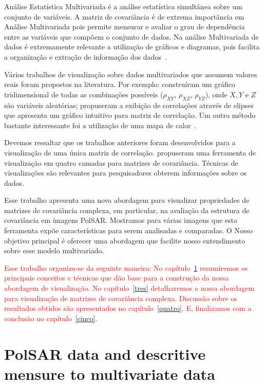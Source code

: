 \documentclass[a4paper,12pt]{article}
\begin{document}
Análise Estatística Multivariada é a análise estatística simultânea sobre um conjunto de variáveis. A matriz de covariância é de extrema importância em Análise Multivariada pois permite mensurar e avaliar o grau de dependência entre as variáveis que compõem o conjunto de dados. Na análise Multivariada de dados é extremamente relevante a utilização de gráficos e diagramas, pois facilita a organização e extração de informação dos dados~\citep{anderson-1958, Everitt-2011}.

Vários trabalhos de visualização sobre dados multivariados que assumem valores reais foram propostos na literatura. Por exemplo: \citet{Rousseeuw-1994} construíram um gráfico tridimensional de todas as combinações possíveis ($\rho_{XY}$, $\rho_{XZ}$, $\rho_{YZ}$), onde $X, Y$ e $Z$ são variáveis aleatórias; \citet{Murdoch-1996} propuseram a exibição de correlações através de elipses que apresenta um gráfico intuitivo para matriz de correlação. Um outro método bastante interessante foi a utilização de uma mapa de calor~\citep{Friendly-2002}.

Devemos ressaltar que os trabalhos anteriores foram desenvolvidos para a visualização de uma única matriz de correlação. \citet{tokuda-2011} propuseram uma ferramenta de visualização em quatro camadas para matrizes de covariância. Técnicas de visualizações são relevantes para pesquisadores obterem informações sobre os dados.

Esse trabalho apresenta uma nova abordagem para visualizar propriedades de matrizes de covariância complexa, em particular, na avaliação da estrutura de covariância em imagens PolSAR. Mostramos para várias imagens que esta ferramenta expõe características para serem analisadas e comparadas. O Nosso objetivo principal é oferecer uma abordagem que facilite nosso entendimento sobre esse modelo multivariado.

\textcolor{red}{Esse trabalho organiza-se da seguinte maneira: No capítulo~\ref{dois} resumiremos os principais conceitos e técnicas que dão base para a construção da nossa abordagem de visualização. No capítulo~\ref{tres} detalharemos a nossa abordagem para visualização de matrizes de covariância complexa. Discussão sobre os resultados obtidos são apresentados no capítulo~\ref{quatro}. E, finalizamos com a conclusão no capítulo~\ref{cinco}.}  



\section{PolSAR data and descritive mensure to multivariate data}\label{dois}
\end{document}
